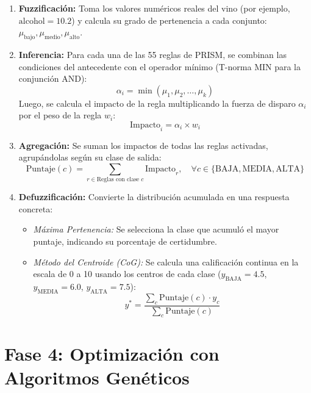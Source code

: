\documentclass[11pt,a4paper]{article}
\begin{document}
\begin{enumerate}
    \item \textbf{Fuzzificación:} Toma los valores numéricos reales del vino (por ejemplo, $\text{alcohol} = 10.2$) y calcula su grado de pertenencia a cada conjunto: $\mu_{\text{bajo}}, \mu_{\text{medio}}, \mu_{\text{alto}}$.
    \item \textbf{Inferencia:} Para cada una de las 55 reglas de PRISM, se combinan las condiciones del antecedente con el operador mínimo (T-norma MIN para la conjunción AND):
    \begin{equation}
    \alpha_i = \min (\mu_1, \mu_2, \dots, \mu_k)
    \end{equation}
    Luego, se calcula el impacto de la regla multiplicando la fuerza de disparo $\alpha_i$ por el peso de la regla $w_i$:
    \begin{equation}
    \text{Impacto}_i = \alpha_i \times w_i
    \end{equation}
    \item \textbf{Agregación:} Se suman los impactos de todas las reglas activadas, agrupándolas según su clase de salida:
    \begin{equation}
    \text{Puntaje}(c) = \sum_{r \in \text{Reglas con clase } c} \text{Impacto}_r, \quad \forall c \in \{\text{BAJA}, \text{MEDIA}, \text{ALTA}\}
    \end{equation}
    \item \textbf{Defuzzificación:} Convierte la distribución acumulada en una respuesta concreta:
    \begin{itemize}
        \item \textit{Máxima Pertenencia:} Se selecciona la clase que acumuló el mayor puntaje, indicando su porcentaje de certidumbre.
        \item \textit{Método del Centroide (CoG):} Se calcula una calificación continua en la escala de 0 a 10 usando los centros de cada clase ($y_{\text{BAJA}}=4.5$, $y_{\text{MEDIA}}=6.0$, $y_{\text{ALTA}}=7.5$):
        \begin{equation}
        y^* = \frac{\sum_c \text{Puntaje}(c) \cdot y_c}{\sum_c \text{Puntaje}(c)}
        \end{equation}
    \end{itemize}
\end{enumerate}

\section{Fase 4: Optimización con Algoritmos Genéticos}
\end{document}
